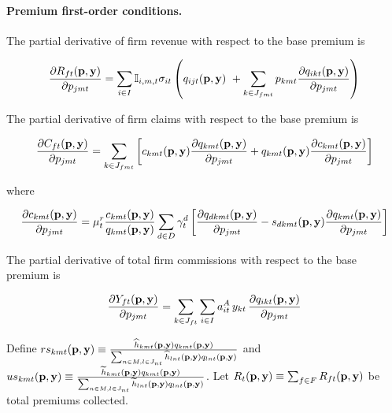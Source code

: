 \documentclass[12pt]{article}
\begin{document}
\paragraph{Premium first-order conditions.} The partial derivative of firm revenue with respect to the base premium is

    \begin{equation*}
		\frac{\partial R_{ft}({\bf p},{\bf y})}{\partial p_{jmt}}  =   \sum_{i \in I} \mathbb{I}_{i,m,t} \sigma_{it} \left(    q_{ijt}({\bf p},{\bf y}) \, \, +   \sum_{k \in J_{fmt}} p_{kmt} \frac{ \partial q_{ikt}({\bf p},{\bf y})}{\partial p_{jmt}}\right)
	\end{equation*}

\noindent The partial derivative of firm claims with respect to the base premium is

	\begin{equation*}
		\frac{\partial C_{ft}({\bf p},{\bf y})}{\partial p_{jmt}} =   \sum_{k \in J_{fmt}}  \left[ c_{kmt}({\bf p},{\bf y})\frac{ \partial q_{kmt}({\bf p},{\bf y})}{\partial p_{jmt}}   +  q_{kmt}({\bf p},{\bf y})\frac{ \partial c_{kmt}({\bf p},{\bf y})}{\partial p_{jmt}}  \right] 	
	\end{equation*}
    
\noindent where

\begin{equation*}
	\frac{\partial c_{kmt}({\bf p},{\bf y})}{\partial p_{jmt}} 
	= \mu_t^r \frac{c_{kmt}({\bf p},{\bf y})}{ q_{kmt}({\bf p},{\bf y})}  \sum_{d \in D} \gamma_t^d \left[\frac{\partial q_{dkmt}({\bf p},{\bf y})}{\partial p_{jmt}} - s_{dkmt}({\bf p},{\bf y}) \frac{\partial q_{kmt}({\bf p},{\bf y})}{\partial p_{jmt}} \right] 
\end{equation*}

\noindent The partial derivative of total firm commissions with respect to the base premium is

\begin{equation*}
    \frac{ \partial Y_{ft}({\bf p},{\bf y})}{\partial p_{jmt}} = \sum_{k \in J_{ft}} \sum_{i \in I} a_{it}^A \, y_{kt}  \, \frac{ \partial q_{ikt}({\bf p},{\bf y})}{\partial p_{jmt}}
\end{equation*}

\noindent 	Define $ rs_{kmt}({\bf p},{\bf y}) \equiv \frac{\widehat{h}_{kmt}({\bf p},{\bf y})q_{kmt}({\bf p},{\bf y})}{\sum_{n \in M,l \in J_{nt}} \widehat{h}_{lnt}({\bf p},{\bf y})q_{lnt}({\bf p},{\bf y})}$ and $us_{kmt}({\bf p},{\bf y}) \equiv \frac{\widetilde{h}_{kmt}({\bf p},{\bf y})q_{kmt}({\bf p},{\bf y})}{\sum_{n \in M, l \in J_{nt}} \widetilde{h}_{lnt}({\bf p},{\bf y})q_{lnt}({\bf p},{\bf y})}$.  Let $R_t({\bf p},{\bf y}) \equiv  \sum_{f \in F} R_{ft}({\bf p},{\bf y})$ be total premiums collected. 
\end{document}
